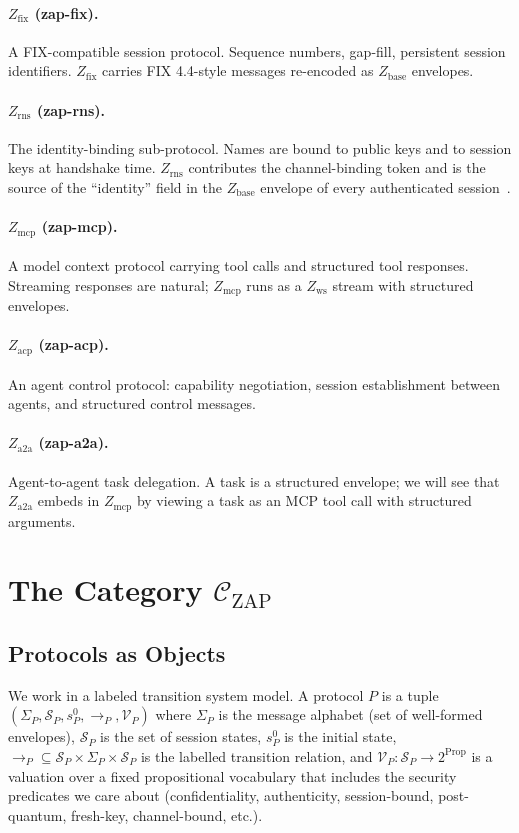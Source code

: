\documentclass[11pt]{article}
\theoremstyle{definition}
\theoremstyle{remark}
\newcommand{\CZ}{\mathcal{C}_{\mathrm{ZAP}}}
\newcommand{\Zb}{Z_{\mathrm{base}}}
\newcommand{\Zw}{Z_{\mathrm{ws}}}
\newcommand{\Zf}{Z_{\mathrm{fix}}}
\newcommand{\Zr}{Z_{\mathrm{rns}}}
\newcommand{\Zm}{Z_{\mathrm{mcp}}}
\newcommand{\Zac}{Z_{\mathrm{acp}}}
\newcommand{\Za}{Z_{\mathrm{a2a}}}
\begin{document}
\paragraph{$\Zf$ (zap-fix).} A FIX-compatible session protocol. Sequence
numbers, gap-fill, persistent session identifiers. $\Zf$ carries FIX
4.4-style messages re-encoded as $\Zb$ envelopes.

\paragraph{$\Zr$ (zap-rns).} The identity-binding sub-protocol. Names
are bound to public keys and to session keys at handshake time. $\Zr$
contributes the channel-binding token and is the source of the
``identity'' field in the $\Zb$ envelope of every authenticated
session~\cite{zap2026rns}.

\paragraph{$\Zm$ (zap-mcp).} A model context protocol carrying tool
calls and structured tool responses. Streaming responses are natural;
$\Zm$ runs as a $\Zw$ stream with structured envelopes.

\paragraph{$\Zac$ (zap-acp).} An agent control protocol: capability
negotiation, session establishment between agents, and structured
control messages.

\paragraph{$\Za$ (zap-a2a).} Agent-to-agent task delegation. A task is
a structured envelope; we will see that $\Za$ embeds in $\Zm$ by
viewing a task as an MCP tool call with structured arguments.

\section{The Category $\CZ$}
\label{sec:category}

\subsection{Protocols as Objects}

We work in a labeled transition system model. A protocol $P$ is a
tuple $(\Sigma_P, \mathcal{S}_P, s^0_P, \to_P, \mathcal{V}_P)$ where
$\Sigma_P$ is the message alphabet (set of well-formed envelopes),
$\mathcal{S}_P$ is the set of session states, $s^0_P$ is the initial
state, $\to_P \subseteq \mathcal{S}_P \times \Sigma_P \times
\mathcal{S}_P$ is the labelled transition relation, and
$\mathcal{V}_P : \mathcal{S}_P \to 2^{\mathrm{Prop}}$ is a valuation
over a fixed propositional vocabulary that includes the security
predicates we care about (confidentiality, authenticity,
session-bound, post-quantum, fresh-key, channel-bound, etc.).
\end{document}
